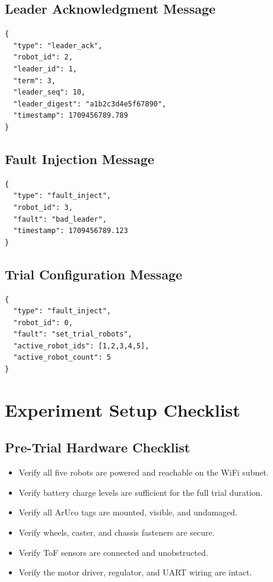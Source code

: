 \documentclass[a4paper,oneside,titlepage,11pt]{report}
\begin{document}
\section{Leader Acknowledgment Message}
\begin{verbatim}
{
  "type": "leader_ack",
  "robot_id": 2,
  "leader_id": 1,
  "term": 3,
  "leader_seq": 10,
  "leader_digest": "a1b2c3d4e5f67890",
  "timestamp": 1709456789.789
}
\end{verbatim}

\section{Fault Injection Message}
\begin{verbatim}
{
  "type": "fault_inject",
  "robot_id": 3,
  "fault": "bad_leader",
  "timestamp": 1709456789.123
}
\end{verbatim}

\section{Trial Configuration Message}
\begin{verbatim}
{
  "type": "fault_inject",
  "robot_id": 0,
  "fault": "set_trial_robots",
  "active_robot_ids": [1,2,3,4,5],
  "active_robot_count": 5
}
\end{verbatim}


\chapter{Experiment Setup Checklist}
\label{app:checklist}

\section{Pre-Trial Hardware Checklist}
\begin{itemize}
    \item Verify all five robots are powered and reachable on the WiFi subnet.
    \item Verify battery charge levels are sufficient for the full trial duration.
    \item Verify all ArUco tags are mounted, visible, and undamaged.
    \item Verify wheels, caster, and chassis fasteners are secure.
    \item Verify ToF sensors are connected and unobstructed.
    \item Verify the motor driver, regulator, and UART wiring are intact.
\end{itemize}
\end{document}
